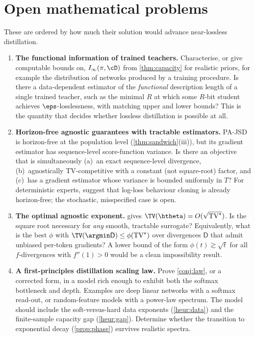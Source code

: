 \section{Open mathematical problems}\label{sec:open}

These are ordered by how much their solution would advance near-lossless distillation.

\begin{enumerate}[leftmargin=*,label=\textbf{P\arabic*.}]
\item \textbf{The functional information of trained teachers.} Characterise, or give computable bounds on,
$I_\infty(\pi,\cD)$ from \cref{thm:capacity} for realistic priors, for example the distribution of networks
produced by a training procedure. Is there a data-dependent estimator of the \emph{functional}
description length of a single trained teacher, such as the minimal $R$ at which some $R$-bit student
achieves $\eps$-losslessness, with matching upper and lower bounds? This is the quantity that decides
whether lossless distillation is possible at all.

\item \textbf{Horizon-free agnostic guarantees with tractable estimators.} PA-JSD is horizon-free at the
population level (\cref{thm:sandwich}(iii)), but its gradient estimator has sequence-level score-function
variance. Is there an objective that is simultaneously (a)~an exact sequence-level divergence, (b)~agnostically
TV-competitive with a constant (not square-root) factor, and (c)~has a gradient estimator whose variance is
bounded uniformly in $T$? For deterministic experts, \citet{foster2024behavior} suggest that log-loss
behaviour cloning is already horizon-free; the stochastic, misspecified case is open.

\item \textbf{The optimal agnostic exponent.}  gives $\TV(\htheta)=O(\sqrt{\mathrm{TV}^\star})$. Is
the square root necessary for \emph{any} smooth, tractable surrogate? Equivalently, what is the best
$\phi$ with $\TV(\argmin\mathsf D)\le\phi(\mathrm{TV}^\star)$ over divergences $\mathsf D$ that admit unbiased
per-token gradients? A lower bound of the form $\phi(t)\gtrsim\sqrt t$ for all $f$-divergences with $f''(1)>0$ would be
a clean impossibility result.

\item \textbf{A first-principles distillation scaling law.} Prove \cref{conj:law}, or a corrected form, in a model
rich enough to exhibit both the softmax bottleneck and depth. Examples are deep linear networks with a
softmax read-out, or random-feature models with a power-law spectrum. The model should include the
soft-versus-hard data exponents (\cref{heur:data}) and the finite-sample capacity gap (\cref{heur:gap}).
Determine whether the transition to exponential decay (\cref{prop:phase}) survives realistic spectra.


\end{enumerate}
